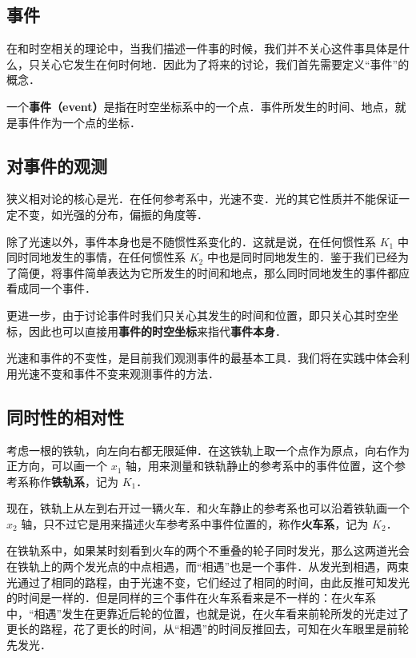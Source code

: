 

\subsection{事件}

在和时空相关的理论中，当我们描述一件事的时候，我们并不关心这件事具体是什么，只关心它发生在何时何地．因此为了将来的讨论，我们首先需要定义“事件”的概念．

一个\textbf{事件（event）}是指在时空坐标系中的一个点．事件所发生的时间、地点，就是事件作为一个点的坐标．

\subsection{对事件的观测}

狭义相对论的核心是光．在任何参考系中，光速不变．光的其它性质并不能保证一定不变，如光强的分布，偏振的角度等．

除了光速以外，事件本身也是不随惯性系变化的．这就是说，在任何惯性系 $K_1$ 中同时同地发生的事情，在任何惯性系 $K_2$ 中也是同时同地发生的．鉴于我们已经为了简便，将事件简单表达为它所发生的时间和地点，那么同时同地发生的事件都应看成同一个事件．

更进一步，由于讨论事件时我们只关心其发生的时间和位置，即只关心其时空坐标，因此也可以直接用\textbf{事件的时空坐标}来指代\textbf{事件本身}．

光速和事件的不变性，是目前我们观测事件的最基本工具．我们将在实践中体会利用光速不变和事件不变来观测事件的方法．

\subsection{同时性的相对性}

考虑一根的铁轨，向左向右都无限延伸．在这铁轨上取一个点作为原点，向右作为正方向，可以画一个 $x_1$ 轴，用来测量和铁轨静止的参考系中的事件位置，这个参考系称作\textbf{铁轨系}，记为 $K_1$．

现在，铁轨上从左到右开过一辆火车．和火车静止的参考系也可以沿着铁轨画一个 $x_2$ 轴，只不过它是用来描述火车参考系中事件位置的，称作\textbf{火车系}，记为 $K_2$．

在铁轨系中，如果某时刻看到火车的两个不重叠的轮子同时发光，那么这两道光会在铁轨上的两个发光点的中点相遇，而“相遇”也是一个事件．从发光到相遇，两束光通过了相同的路程，由于光速不变，它们经过了相同的时间，由此反推可知发光的时间是一样的．但是同样的三个事件在火车系看来是不一样的：在火车系中，“相遇”发生在更靠近后轮的位置，也就是说，在火车看来前轮所发的光走过了更长的路程，花了更长的时间，从“相遇”的时间反推回去，可知在火车眼里是前轮先发光．


